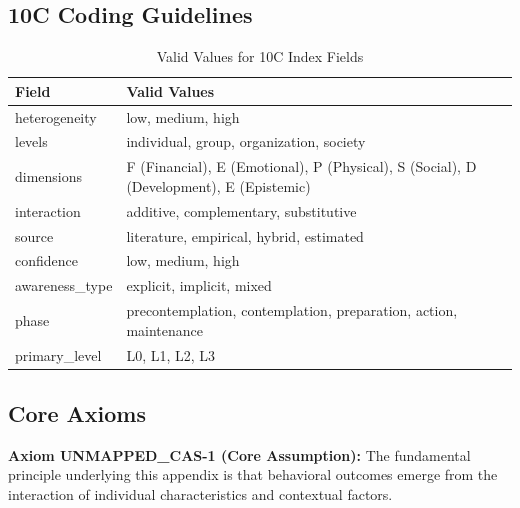 \subsection{10C Coding Guidelines}

\begin{table}[h]
\centering
\begin{tabular}{lp{8cm}}
\toprule
\textbf{Field} & \textbf{Valid Values} \\
\midrule
heterogeneity & low, medium, high \\
levels & individual, group, organization, society \\
dimensions & F (Financial), E (Emotional), P (Physical), S (Social), D (Development), E (Epistemic) \\
interaction & additive, complementary, substitutive \\
source & literature, empirical, hybrid, estimated \\
confidence & low, medium, high \\
awareness\_type & explicit, implicit, mixed \\
phase & precontemplation, contemplation, preparation, action, maintenance \\
primary\_level & L0, L1, L2, L3 \\
\bottomrule
\end{tabular}
\caption{Valid Values for 10C Index Fields}
\end{table}


\subsection{Core Axioms}
\label{sec:cas-axioms}

\begin{tcolorbox}[colback=yellow!5!white,colframe=yellow!75!black,title=Axiom UNMAPPED_CAS-1: Fundamental Principle]
\textbf{Axiom UNMAPPED_CAS-1 (Core Assumption):}
The fundamental principle underlying this appendix is that behavioral outcomes
emerge from the interaction of individual characteristics and contextual factors.
\end{tcolorbox}

